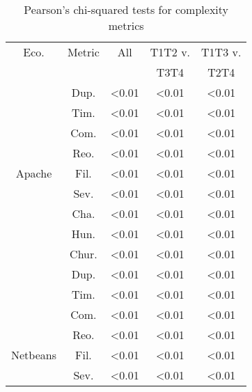
\begin{table}[]
\centering
\small
\caption{Pearson's chi-squared tests for complexity metrics}
\label{tab:chi-rq2}
\begin{tabular}{ccccc}
Eco. & Metric & All & T1T2 v. & T1T3 v. \\
          &        &  & T3T4 & T2T4 \\ \hline \rowcolor{gray!25}
          & Dup.   & \textless0.01         & \textless0.01         & \textless0.01         \\ \rowcolor{gray!25}
          & Tim.   & \textless0.01         & \textless0.01         & \textless0.01         \\ \rowcolor{gray!25}
          & Com.   & \textless0.01         & \textless0.01         & \textless0.01         \\ \rowcolor{gray!25}
          & Reo.   & \textless0.01         & \textless0.01         & \textless0.01         \\ \rowcolor{gray!25}
Apache    & Fil.   & \textless0.01         & \textless0.01         & \textless0.01         \\ \rowcolor{gray!25}
          & Sev.   & \textless0.01         & \textless0.01         & \textless0.01         \\ \rowcolor{gray!25}
          & Cha.   & \textless0.01         & \textless0.01         & \textless0.01         \\ \rowcolor{gray!25}
          & Hun.   & \textless0.01         & \textless0.01         & \textless0.01         \\ \rowcolor{gray!25}
          & Chur.  & \textless0.01         & \textless0.01         & \textless0.01         \\
          & Dup.   & \textless0.01         & \textless0.01         & \textless0.01         \\
          & Tim.   & \textless0.01         & \textless0.01         & \textless0.01         \\
          & Com.   & \textless0.01         & \textless0.01         & \textless0.01         \\
          & Reo.   & \textless0.01         & \textless0.01         & \textless0.01         \\
Netbeans  & Fil.   & \textless0.01         & \textless0.01         & \textless0.01         \\
          & Sev.   & \textless0.01         & \textless0.01         & \textless0.01         \\

\end{tabular}
\end{table}
